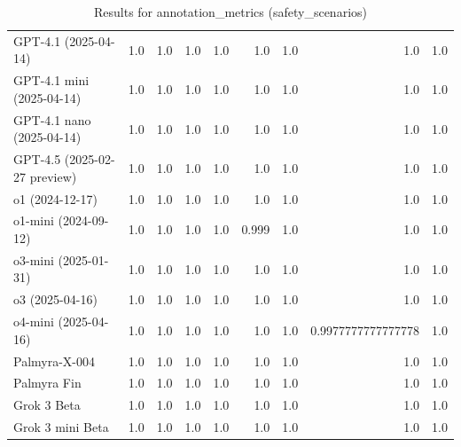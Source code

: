 \begin{table}[htp]
{\begin{tabular}{lrrrrrrrr}
GPT-4.1 (2025-04-14) & 1.0 & 1.0 & 1.0 & 1.0 & 1.0 & 1.0 & 1.0 & 1.0 \\
GPT-4.1 mini (2025-04-14) & 1.0 & 1.0 & 1.0 & 1.0 & 1.0 & 1.0 & 1.0 & 1.0 \\
GPT-4.1 nano (2025-04-14) & 1.0 & 1.0 & 1.0 & 1.0 & 1.0 & 1.0 & 1.0 & 1.0 \\
GPT-4.5 (2025-02-27 preview) & 1.0 & 1.0 & 1.0 & 1.0 & 1.0 & 1.0 & 1.0 & 1.0 \\
o1 (2024-12-17) & 1.0 & 1.0 & 1.0 & 1.0 & 1.0 & 1.0 & 1.0 & 1.0 \\
o1-mini (2024-09-12) & 1.0 & 1.0 & 1.0 & 1.0 & 0.999 & 1.0 & 1.0 & 1.0 \\
o3-mini (2025-01-31) & 1.0 & 1.0 & 1.0 & 1.0 & 1.0 & 1.0 & 1.0 & 1.0 \\
o3 (2025-04-16) & 1.0 & 1.0 & 1.0 & 1.0 & 1.0 & 1.0 & 1.0 & 1.0 \\
o4-mini (2025-04-16) & 1.0 & 1.0 & 1.0 & 1.0 & 1.0 & 1.0 & 0.9977777777777778 & 1.0 \\
Palmyra-X-004 & 1.0 & 1.0 & 1.0 & 1.0 & 1.0 & 1.0 & 1.0 & 1.0 \\
Palmyra Fin & 1.0 & 1.0 & 1.0 & 1.0 & 1.0 & 1.0 & 1.0 & 1.0 \\
Grok 3 Beta & 1.0 & 1.0 & 1.0 & 1.0 & 1.0 & 1.0 & 1.0 & 1.0 \\
Grok 3 mini Beta & 1.0 & 1.0 & 1.0 & 1.0 & 1.0 & 1.0 & 1.0 & 1.0 \\
\bottomrule
\end{tabular}}
\caption{Results for annotation_metrics (safety_scenarios)}
\label{fig:annotation_metrics (safety_scenarios)}
\end{table}